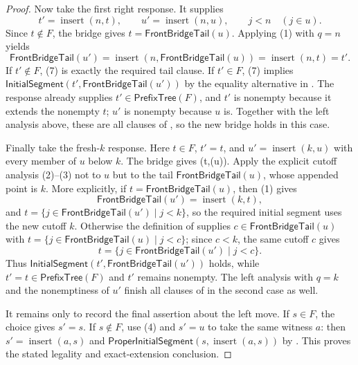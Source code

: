 \begin{proof}
Now take the first right response.  It supplies
\[
 t'=\operatorname{insert}(n,t),\qquad
 u'=\operatorname{insert}(n,u),\qquad
 j<n\quad(j\in u).
 \tag{6}
\]
Since $t\notin F$, the bridge gives
$t=\mathsf{FrontBridgeTail}(u)$.  Applying (1) with $q=n$ yields
\[
 \mathsf{FrontBridgeTail}(u')
 =\operatorname{insert}(n,\mathsf{FrontBridgeTail}(u))
 =\operatorname{insert}(n,t)=t'.
 \tag{7}
\]
If $t'\notin F$, (7) is exactly the required tail clause.  If $t'\in F$,
(7) implies $\mathsf{InitialSegment}(t',\mathsf{FrontBridgeTail}(u'))$
by the equality alternative in .  The response
already supplies $t'\in\mathsf{PrefixTree}(F)$, and $t'$ is nonempty
because it extends the nonempty $t$; $u'$ is nonempty because $u$ is.
Together with the left analysis above, these are all clauses of
, so the new bridge holds in this case.

Finally take the fresh-$k$ response.  Here $t\in F$, $t'=t$, and
$u'=\operatorname{insert}(k,u)$ with every member of $u$ below $k$.
The bridge gives
(t,(u)).  Apply the
explicit cutoff analysis (2)--(3) not to $u$ but to the tail
$\mathsf{FrontBridgeTail}(u)$, whose appended point is $k$.  More
explicitly, if $t=\mathsf{FrontBridgeTail}(u)$, then (1) gives
\[
 \mathsf{FrontBridgeTail}(u')
 =\operatorname{insert}(k,t),
 \]
and $t=\{j\in\mathsf{FrontBridgeTail}(u')\mid j<k\}$, so the required
initial segment uses the new cutoff $k$.  Otherwise the definition of
 supplies $c\in\mathsf{FrontBridgeTail}(u)$ with
$t=\{j\in\mathsf{FrontBridgeTail}(u)\mid j<c\}$; since $c<k$, the same
cutoff $c$ gives
\[
 t=\{j\in\mathsf{FrontBridgeTail}(u')\mid j<c\}.
\]
Thus $\mathsf{InitialSegment}(t',\mathsf{FrontBridgeTail}(u'))$ holds,
while $t'=t\in\mathsf{PrefixTree}(F)$ and $t'$ remains nonempty.  The
left analysis with $q=k$ and the nonemptiness of $u'$ finish all clauses
of  in the second case as well.

It remains only to record the final assertion about the left move.  If
$s\in F$, the choice gives $s'=s$.  If $s\notin F$, use (4) and
$s'=u$ to take the same witness $a$: then
$s'=\operatorname{insert}(a,s)$ and
$\mathsf{ProperInitialSegment}(s,\operatorname{insert}(a,s))$ by
.
This proves the stated legality and exact-extension conclusion.
\end{proof}
